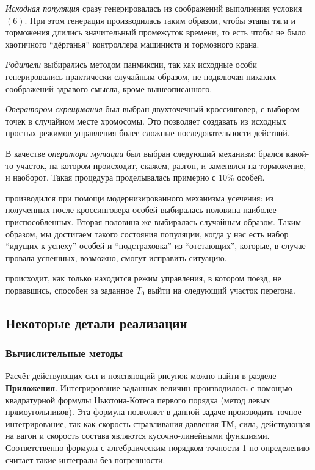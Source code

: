 \textit{Исходная популяция} сразу генерировалась из соображений выполнения условия $(6)$. При этом генерация производилась таким образом, чтобы этапы тяги и торможения длились значительный промежуток времени, то есть чтобы не было хаотичного ``дёрганья'' контроллера машиниста и тормозного крана.

\textit{Родители} выбирались методом панмиксии, так как исходные особи генерировались практически случайным образом, не подключая никаких соображений здравого смысла, кроме вышеописанного.

\textit{Оператором скрещивания} был выбран двухточечный кроссинговер, с выбором точек в случайном месте хромосомы. Это позволяет создавать из исходных простых режимов управления более сложные последовательности действий.

В качестве \textit{оператора мутации} был выбран следующий механизм: брался какой-то участок, на котором происходит, скажем, разгон, и заменялся на торможение, и наоборот. Такая процедура проделывалась примерно с 10\% особей.

 производился при помощи модернизированного механизма усечения: из полученных после кроссинговера особей выбиралась половина наиболее приспособленных. Вторая половина же выбиралась случайным образом. Таким образом, мы достигаем такого состояния популяции, когда у нас есть набор ``идущих к успеху'' особей и ``подстраховка'' из ``отстающих'', которые, в случае провала успешных, возможно, смогут исправить ситуацию.

 происходит, как только находится режим управления, в котором поезд, не порвавшись, способен за заданное $T_0$ выйти на следующий участок перегона.

\subsection{Некоторые детали реализации}

\subsubsection{Вычислительные методы}
Расчёт действующих сил и поясняющий рисунок можно найти в разделе \textbf{Приложения}.
Интегрирование заданных величин производилось с помощью квадратурной формулы Ньютона-Котеса первого порядка (метод левых прямоугольников). Эта формула позволяет в данной задаче производить точное интегрирование, так как скорость стравливания давления ТМ,  сила, действующая на вагон и скорость состава являются кусочно-линейными функциями. Соответственно формула с алгебраическим порядком точности 1 по определению считает такие интегралы без погрешности.

